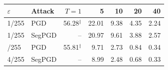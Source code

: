 \begin{tabular}{@{}llrrrrr@{}}
\toprule
$\varepsilon$ & Attack & $T{=}1$ & 5 & 10 & 20 & 40 \\
\midrule
1/255 & PGD & 56.28$^\ddagger$ & 22.01 & 9.38 & 4.35 & 2.24 \\
1/255 & SegPGD & -- & 20.97 & 9.61 & 3.88 & 2.57 \\
\addlinespace[2pt]
4/255 & PGD & 55.81$^\ddagger$ & 9.71 & 2.73 & 0.84 & 0.34 \\
4/255 & SegPGD & -- & 8.99 & 2.48 & 0.68 & 0.33 \\
\bottomrule
\end{tabular}
